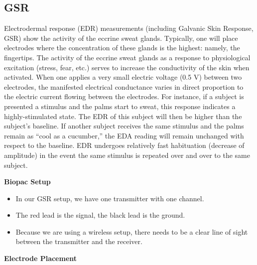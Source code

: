 \documentclass[]{book}
\providecommand{\tightlist}{%
  \setlength{\itemsep}{0pt}\setlength{\parskip}{0pt}}
\begin{document}
\hypertarget{gsr}{%
\subsection{GSR}\label{gsr}}

Electrodermal response (EDR) measurements (including Galvanic Skin Response, GSR) show the activity of the eccrine sweat glands. Typically, one will place electrodes where the concentration of these glands is the highest: namely, the fingertips. The activity of the eccrine sweat glands as a response to physiological excitation (stress, fear, etc.) serves to increase the conductivity of the skin when activated. When one applies a very small electric voltage (0.5 V) between two electrodes, the manifested electrical conductance varies in direct proportion to the electric current flowing between the electrodes. For instance, if a subject is presented a stimulus and the palms start to sweat, this response indicates a highly-stimulated state. The EDR of this subject will then be higher than the subject's baseline. If another subject receives the same stimulus and the palms remain as ``cool as a cucumber,'' the EDA reading will remain unchanged with respect to the baseline. EDR undergoes relatively fast habituation (decrease of amplitude) in the event the same stimulus is repeated over and over to the same subject.

\textbf{Biopac Setup}

\begin{itemize}
\tightlist
\item
  In our GSR setup, we have one transmitter with one channel.
\item
  The red lead is the signal, the black lead is the ground.
\item
  Because we are using a wireless setup, there needs to be a clear line of sight between the transmitter and the receiver.
\end{itemize}

\textbf{Electrode Placement}
\end{document}
